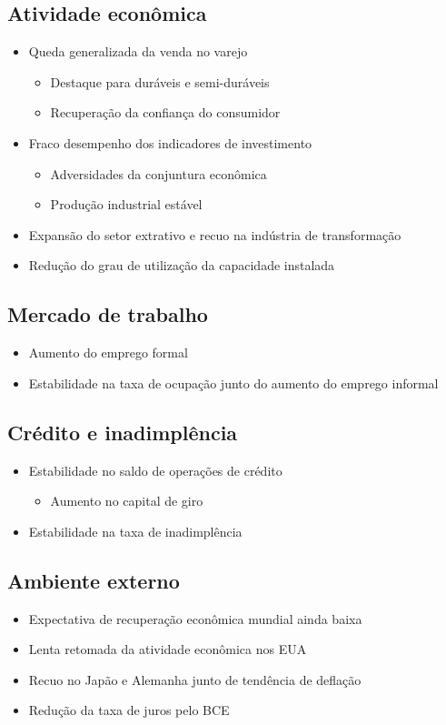 \documentclass[11pt]{article}
\begin{document}
\subsection*{Atividade econômica}
\label{sec:org5f8113e}
\begin{itemize}
\item Queda generalizada da venda no varejo 
\begin{itemize}
\item Destaque para duráveis e semi-duráveis
\item Recuperação da confiança do consumidor
\end{itemize}
\item Fraco desempenho dos indicadores de investimento
\begin{itemize}
\item Adversidades da conjuntura econômica
\item Produção industrial estável
\end{itemize}
\item Expansão do setor extrativo e recuo na indústria de transformação
\item Redução do grau de utilização da capacidade instalada
\end{itemize}
\subsection*{Mercado de trabalho}
\label{sec:org4729886}
\begin{itemize}
\item Aumento do emprego formal
\item Estabilidade na taxa de ocupação junto do aumento do emprego informal
\end{itemize}
\subsection*{Crédito e inadimplência}
\label{sec:org3315c75}
\begin{itemize}
\item Estabilidade no saldo de operações de crédito
\begin{itemize}
\item Aumento no capital de giro
\end{itemize}
\item Estabilidade na taxa de inadimplência
\end{itemize}
\subsection*{Ambiente externo}
\label{sec:org6debbcb}
\begin{itemize}
\item Expectativa de recuperação econômica mundial ainda baixa
\item Lenta retomada da atividade econômica nos EUA
\item Recuo no Japão e Alemanha junto de tendência de deflação
\item Redução da taxa de juros pelo BCE
\end{itemize}
\end{document}
